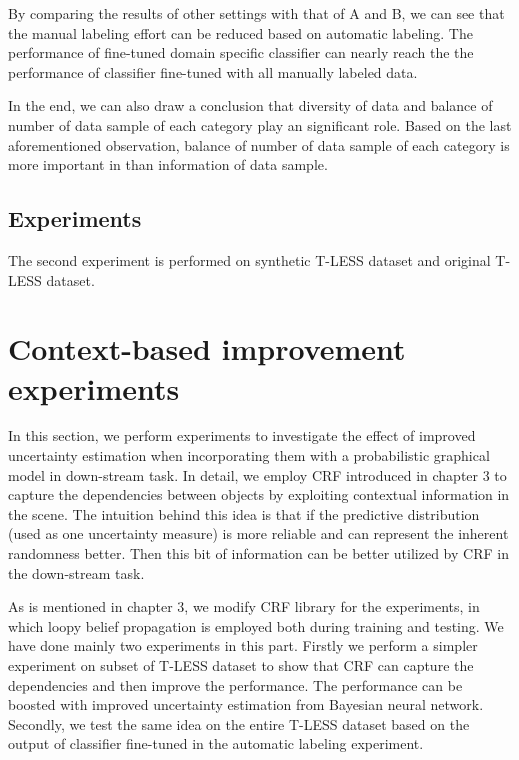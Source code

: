 By comparing the results of other settings with that of A and B, we can see that the manual labeling effort can be reduced based on automatic labeling.  The performance of fine-tuned domain specific classifier can nearly reach the the performance of classifier fine-tuned with all manually labeled data. 

In the end, we can also draw a conclusion that diversity of data and balance of number of data sample of each category play an significant role. Based on the last aforementioned observation, balance of number of data sample of each category is more important in than information of data sample.

\subsection{Experiments }
The second experiment is performed on synthetic T-LESS dataset and original T-LESS dataset.


\section{Context-based improvement experiments}
In this section, we perform experiments to investigate the effect of improved uncertainty estimation when incorporating them with a probabilistic graphical model in down-stream task. In detail, we employ CRF introduced in chapter 3 to capture the dependencies between objects by exploiting contextual information in the scene. The intuition behind this idea is that if the predictive distribution (used as one uncertainty measure) is more reliable and can represent the inherent randomness better. Then this bit of information can be better utilized by CRF in the down-stream task. 

As is mentioned in chapter 3, we modify CRF library \cite{Ruiz-Sarmiento-REACTS-2015} for the experiments, in which loopy belief propagation is employed both during training and testing. We have done mainly two experiments in this part. Firstly we perform a simpler experiment on subset of T-LESS dataset to show that CRF can capture the dependencies and then improve the performance. The performance can be boosted with improved uncertainty estimation from Bayesian neural network. Secondly, we test the same idea on the entire T-LESS dataset based on the output of classifier fine-tuned in the automatic labeling experiment. 



